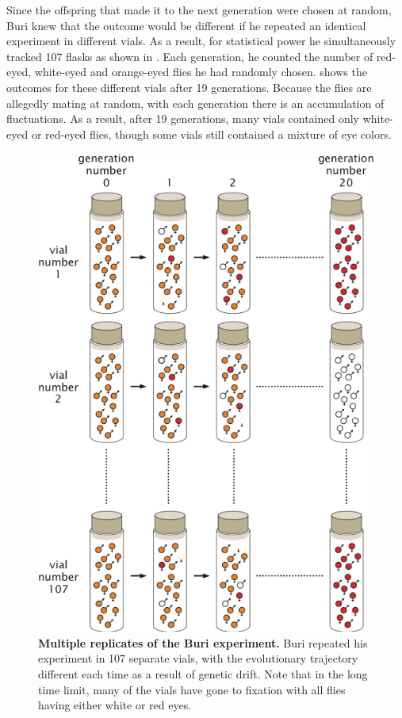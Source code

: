 Since the offspring that made it to the next generation were chosen at random,
Buri knew that the outcome would be different if he repeated an identical
experiment in different vials. As a result, for statistical power he
simultaneously tracked 107 flasks as shown in \fref[figBuriSchematic]. Each
generation, he counted the number of red-eyed, white-eyed and orange-eyed flies
he had randomly chosen. \fref[figBuriGenerations] shows the outcomes for these
different vials after 19 generations. Because the flies are allegedly mating at
random, with each generation there is an accumulation of fluctuations. As a
result, after 19 generations, many vials contained only white-eyed or red-eyed
flies, though some vials still contained a mixture of eye colors.

\begin{figure}[h!]
\centering \includegraphics[scale=0.7]
  {../fig/drift_langevin/02_buri_generations.png}
  \caption{\textbf{Multiple replicates of the Buri experiment.}  Buri repeated
  his experiment in 107 separate vials, with the evolutionary trajectory
  different each time as a result of genetic drift.  Note that in the long time
  limit, many of the vials have gone to fixation with all flies having either
  white or red eyes.}
\label{fig_02_buri_generations}
\end{figure}

